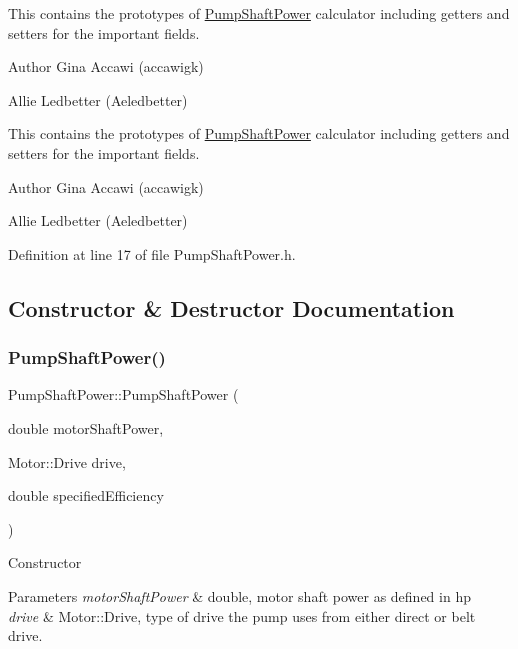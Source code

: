 This contains the prototypes of \hyperlink{class_pump_shaft_power}{Pump\+Shaft\+Power} calculator including getters and setters for the important fields.

\begin{DoxyAuthor}{Author}
Gina Accawi (accawigk) 

Allie Ledbetter (Aeledbetter) 
\end{DoxyAuthor}


This contains the prototypes of \hyperlink{class_pump_shaft_power}{Pump\+Shaft\+Power} calculator including getters and setters for the important fields.

\begin{DoxyAuthor}{Author}
Gina Accawi (accawigk) 

Allie Ledbetter (Aeledbetter) 
\end{DoxyAuthor}


Definition at line 17 of file Pump\+Shaft\+Power.\+h.



\subsection{Constructor \& Destructor Documentation}
\mbox{\label{class_pump_shaft_power_a7eea468dbb3efe1f0e8ae77a2d16efe2}} 
\subsubsection{\texorpdfstring{Pump\+Shaft\+Power()}{PumpShaftPower()}\hspace{0.1cm}{\footnotesize\ttfamily [1/3]}}
{\footnotesize\ttfamily Pump\+Shaft\+Power\+::\+Pump\+Shaft\+Power (\begin{DoxyParamCaption}\item[{double}]{motor\+Shaft\+Power,  }\item[{Motor\+::\+Drive}]{drive,  }\item[{double}]{specified\+Efficiency }\end{DoxyParamCaption})\hspace{0.3cm}{\ttfamily [inline]}}

Constructor 
\begin{DoxyParams}{Parameters}
{\em motor\+Shaft\+Power} & double, motor shaft power as defined in hp \\
\hline
{\em drive} & Motor\+::\+Drive, type of drive the pump uses from either direct or belt drive. \\
\hline
\end{DoxyParams}


